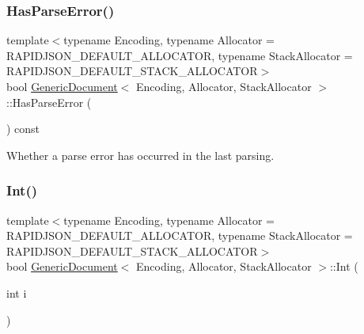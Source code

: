 \mbox{\label{classGenericDocument_a510a0588db4eb372f5d81bc3646578fb}} 
\subsubsection{\texorpdfstring{Has\+Parse\+Error()}{HasParseError()}}
{\footnotesize\ttfamily template$<$typename Encoding, typename Allocator = R\+A\+P\+I\+D\+J\+S\+O\+N\+\_\+\+D\+E\+F\+A\+U\+L\+T\+\_\+\+A\+L\+L\+O\+C\+A\+T\+OR, typename Stack\+Allocator = R\+A\+P\+I\+D\+J\+S\+O\+N\+\_\+\+D\+E\+F\+A\+U\+L\+T\+\_\+\+S\+T\+A\+C\+K\+\_\+\+A\+L\+L\+O\+C\+A\+T\+OR$>$ \\
bool \hyperlink{classGenericDocument}{Generic\+Document}$<$ Encoding, Allocator, Stack\+Allocator $>$\+::Has\+Parse\+Error (\begin{DoxyParamCaption}{ }\end{DoxyParamCaption}) const\hspace{0.3cm}{\ttfamily [inline]}}



Whether a parse error has occurred in the last parsing. 

\mbox{\label{classGenericDocument_a8cc986266becaa268474c607489745c7}} 
\subsubsection{\texorpdfstring{Int()}{Int()}}
{\footnotesize\ttfamily template$<$typename Encoding, typename Allocator = R\+A\+P\+I\+D\+J\+S\+O\+N\+\_\+\+D\+E\+F\+A\+U\+L\+T\+\_\+\+A\+L\+L\+O\+C\+A\+T\+OR, typename Stack\+Allocator = R\+A\+P\+I\+D\+J\+S\+O\+N\+\_\+\+D\+E\+F\+A\+U\+L\+T\+\_\+\+S\+T\+A\+C\+K\+\_\+\+A\+L\+L\+O\+C\+A\+T\+OR$>$ \\
bool \hyperlink{classGenericDocument}{Generic\+Document}$<$ Encoding, Allocator, Stack\+Allocator $>$\+::Int (\begin{DoxyParamCaption}\item[{int}]{i }\end{DoxyParamCaption})\hspace{0.3cm}{\ttfamily [inline]}}

\mbox{\label{classGenericDocument_a934b1b7a7ed89917615a5410db77a942}} 
